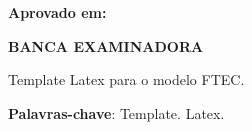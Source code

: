 \documentclass[
	12pt,				%
	openright,			%
	oneside,
	a4paper,			%
	sumario=tradicional,
	chapter=TITLE,		%
	section=TITLE,		%
	english,			%
	french,				%
	spanish,			%
	brazil				%
	]{ftex}
\begin{document}

\frenchspacing

\pretextual

\imprimircapa

\imprimirfolhaderosto*

\makeatletter
\begin{folhadeaprovacao}
\begin{center}
    {\ABNTEXchapterfont\bfseries\normalsize\imprimirautor}
    \vfill

    \ABNTEXchapterfont\bfseries\large\imprimirtitulo
\end{center}

\vfill

\abntex@ifnotempty{\imprimirpreambulo}{%
  \hspace{.35\textwidth}
  \begin{minipage}{.5\textwidth}
  \ABNTEXchapterfont\bfseries\normalsize\imprimirpreambulo
  \end{minipage}%
  \vfill
}%
\ABNTEXchapterfont\bfseries\normalsize{}Aprovado em:
\vfill
\begin{center}
    \ABNTEXchapterfont\bfseries\normalsize{}BANCA EXAMINADORA \\
    \vspace*{\fill}
    {\bfseries\normalsize\imprimirlocal}
    \par
    {\bfseries\normalsize\imprimirdata}
\end{center}
\end{folhadeaprovacao}
\makeatother

\setlength{\absparsep}{16pt} %
\begin{resumo}
Template Latex para o modelo FTEC.

\textbf{Palavras-chave}: Template. Latex.
\end{resumo}
\end{document}
